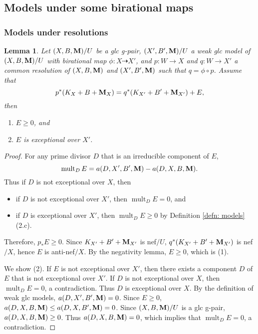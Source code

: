 \documentclass[11pt]{amsart}
\numberwithin{equation}{section}
\newcommand{\Mm}{{\bf{M}}}
\newcommand{\mult}{\operatorname{mult}}
\newtheorem{lem}[thm]{Lemma}
\theoremstyle{definition}
\theoremstyle{definition}
\theoremstyle{definition}
\begin{document}
\subsection{Models under some birational maps}

\subsubsection{Models under resolutions}

\begin{lem}\label{lem: g-pair version bir12 2.6}
Let $(X,B,\Mm)/U$ be a glc g-pair, $(X',B',\Mm)/U$ a weak glc model of $(X,B,\Mm)/U$ with birational map $\phi: X\dashrightarrow X'$, and $p: W\rightarrow X$ and $q: W\rightarrow X'$ a common resolution of $(X,B,\Mm)$ and $(X',B',\Mm)$ such that $q=\phi\circ p$. Assume that
$$p^*(K_X+B+\Mm_X)=q^*(K_{X'}+B'+\Mm_{X'})+E,$$
then
\begin{enumerate}
    \item $E\geq 0$, and
    \item $E$ is exceptional over $X'$.
\end{enumerate}
\end{lem}
\begin{proof}
For any prime divisor $D$ that is an irreducible component of $E$, $$\mult_DE=a(D,X',B',\Mm)-a(D,X,B,\Mm).$$ Thus if $D$ is not exceptional over $X$, then
\begin{itemize}
    \item if $D$ is not exceptional over $X'$, then $\mult_DE=0$, and
    \item if $D$ is exceptional over $X'$, then $\mult_DE\geq 0$ by Definition \ref{defn: models}(2.c).
\end{itemize}
Therefore, $p_*E\geq 0$. Since $K_{X'}+B'+\Mm_{X'}$ is nef$/U$, $q^*(K_{X'}+B'+\Mm_{X'})$ is nef$/X$, hence $E$ is anti-nef$/X$. By the negativity lemma, $E\geq 0$, which is (1).

We show (2). If $E$ is not exceptional over $X'$, then there exists a component $D$ of $E$ that is not exceptional over $X'$. If $D$ is not exceptional over $X$, then $\mult_DE=0$, a contradiction. Thus $D$ is exceptional over $X$. By the definition of weak glc models, $a(D,X',B',\Mm)=0$. Since $E\geq 0$, $a(D,X,B,\Mm)\leq a(D,X,B',\Mm)=0$. Since $(X,B,\Mm)/U$ is a glc g-pair, $a(D,X,B,\Mm)\geq 0$. Thus $a(D,X,B,\Mm)=0$, which implies that $\mult_DE=0$, a contradiction.
\end{proof}
\end{document}
